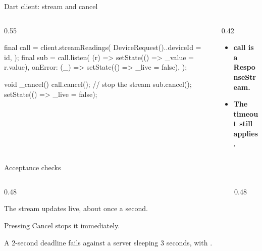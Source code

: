 \documentclass[10pt,aspectratio=169,t]{beamer}
\begin{document}
\begin{frame}[fragile,eyebrow=Task III]{Dart client: stream and cancel}
  \begin{columns}[T]
    \begin{column}{0.55\textwidth}
\begin{dart}
final call = client.streamReadings(
  DeviceRequest()..deviceId = id,
);
final sub = call.listen(
  (r) => setState(() => _value = r.value),
  onError: (_) =>
      setState(() => _live = false),
);

void _cancel() {
  call.cancel();   // stop the stream
  sub.cancel();
  setState(() => _live = false);
}
\end{dart}
    \end{column}
    \begin{column}{0.42\textwidth}
      \begin{itemize}
        \item \textbf{call is a ResponseStream.} 
        \item \textbf{The timeout still applies.} 
      \end{itemize}
    \end{column}
  \end{columns}
\end{frame}

\begin{frame}[eyebrow=Acceptance]{Acceptance checks}
  \vskip 1mm
  \begin{columns}[T]
    \begin{column}{0.48\textwidth}
      \begin{checklist}
        \item The stream updates live, about once a second.
        \item Pressing Cancel stops it immediately.
        \item A 2-second deadline fails  against a server sleeping 3 seconds, with .
      \end{checklist}
    \end{column}
    \begin{column}{0.48\textwidth}
    \end{column}
  \end{columns}
\end{frame}
\end{document}

